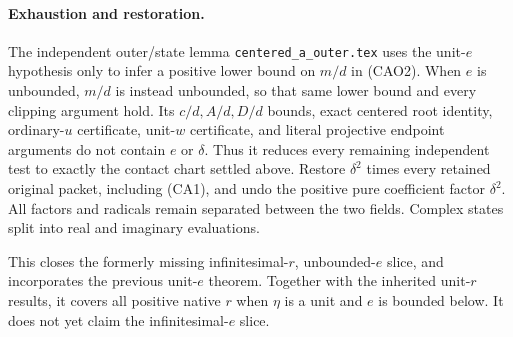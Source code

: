 \paragraph{Exhaustion and restoration.}
The independent outer/state lemma \texttt{centered\_a\_outer.tex}
uses the unit-$e$ hypothesis only to infer a positive lower bound on
$m/d$ in (CAO2). When $e$ is unbounded, $m/d$ is instead unbounded,
so that same lower bound and every clipping argument hold. Its
$c/d,A/d,D/d$ bounds, exact centered root identity, ordinary-$u$
certificate, unit-$w$ certificate, and literal projective endpoint
arguments do not contain $e$ or $\delta$. Thus it reduces every
remaining independent test to exactly the contact chart settled above.
Restore $\delta^2$ times every retained original packet, including
(CA1), and undo the positive pure coefficient factor $\delta^2$.
All factors and radicals remain separated between the two fields.
Complex states split into real and imaginary evaluations.

This closes the formerly missing infinitesimal-$r$, unbounded-$e$
slice, and incorporates the previous unit-$e$ theorem. Together with
the inherited unit-$r$ results, it covers all positive native $r$
when $\eta$ is a unit and $e$ is bounded below. It does not yet
claim the infinitesimal-$e$ slice.
